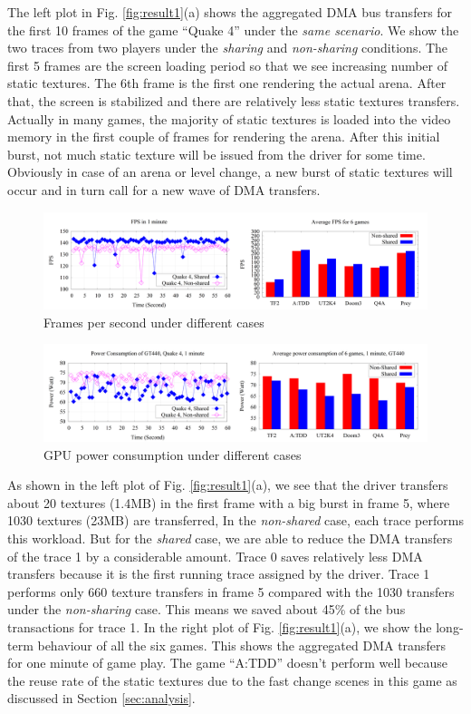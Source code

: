 \documentclass[pageno]{jpaper}
\begin{document}
The left plot in Fig. \ref{fig:result1}(a) shows the aggregated DMA bus transfers
for the first 10 frames of the game ``Quake 4'' under the \emph{same scenario}. We show the two traces from two players under the \emph{sharing} and \emph{non-sharing} conditions. The first 5 frames are the screen loading period so that we see increasing number of static textures. The 6th frame is the first one rendering the actual arena. After that, the screen is stabilized and there are relatively less static textures transfers.
Actually in many games, the majority of static textures is loaded into the video memory in the first couple of frames for rendering the arena. After this initial
burst, not much static texture will be issued from the driver for some time. Obviously in case of
  an arena or level change, a new burst of static textures will occur and in turn call for a new wave of DMA transfers.


 \begin{figure}
\centering
\includegraphics[width=7.4in]{pics/7.png}
\caption{Frames per second under different cases}
\label{fig:result3}
\end{figure}

 \begin{figure}
\centering
\includegraphics[width=7.4in]{pics/8.png}
\caption{GPU power consumption under different cases}
\label{fig:result4}
\end{figure}

As shown in the left plot of Fig. \ref{fig:result1}(a), we see that the driver transfers about 20 textures (1.4MB) in the first frame with a big burst in frame 5, where 1030 textures (23MB) are transferred,
In the \emph{non-shared} case, each trace performs
this workload. But for the \emph{shared} case, we are able to reduce the DMA transfers of
the trace 1 by a considerable amount. Trace 0 saves relatively less DMA transfers because it is the first running trace assigned by the driver.
Trace 1 performs only 660 texture transfers in frame 5 compared with the 1030 transfers under the \emph{non-sharing} case. This
means we saved about 45\% of the bus transactions for trace 1. In the right plot of Fig. \ref{fig:result1}(a), we show the long-term behaviour of all the six games. This shows the aggregated DMA transfers for one minute of game play. The game ``A:TDD'' doesn't perform well because the reuse rate of the static textures due to the fast change scenes in this game as discussed in Section \ref{sec:analysis}.
\end{document}
